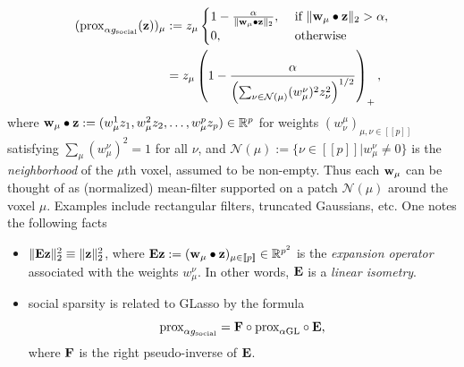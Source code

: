  \begin{equation}
   \begin{split}
     (\operatorname{prox}_{\alpha g_{\text{social}}}(\mathbf{z}))_\mu &:=
     z_\mu\begin{cases}1 - \frac{\alpha}{\|\mathbf{w}_\mu \bullet \mathbf{z}\|_2}, &\mbox{ if }\|\mathbf{w}_\mu \bullet \mathbf{z}\|_2 > \alpha
       ,\\0, &\mbox{ otherwise}\end{cases}\\
     &=
     z_\mu\left(1 - \frac{\alpha}{\left(\sum_{\nu \in \mathcal N(\mu)}(w^{\nu}_{\mu})^2z_{\nu}^2\right)^{1/2}}\right)_+, 
     \end{split}
  \label{eq:social}
\end{equation}
where $\mathbf{w}_\mu \bullet \mathbf{z} := (w^1_\mu z_1,w^2_\mu z_2,\ldots,w^p_\mu z_p) \in \mathbb R^p$ for weights
$(w^\mu_\nu)_{\mu,\nu \in [\![p]\!]}$ satisfying $\sum_\mu (w^\nu_\mu)^2 = 1$ for all $\nu$, and $\mathcal N (\mu) := \{\nu \in [\![p]\!] | w^\nu_\mu \ne 0\}$ is the \textit{neighborhood} of the $\mu$th voxel, assumed to be non-empty. Thus each $\mathbf{w}_\mu$ can be thought of as
(normalized) mean-filter supported on a patch $\mathcal N(\mu)$ around the voxel $\mu$.
Examples include rectangular filters, truncated Gaussians, etc.
One notes the following facts
\begin{itemize}
\item $\|\mathbf{E}\mathbf{z}\|^2_2 \equiv \|\mathbf{z}\|^2_2$, where $\mathbf{E}\mathbf{z} := (\mathbf{w}_\mu \bullet \mathbf{z})_{\mu \in [\![p]\!]} \in \mathbb R^{p^2}$
  is the \textit{expansion operator} associated with the weights $w^\nu_\mu$. In other words, $\mathbf{E}$ is a \textit{linear isometry}.
\item social sparsity is related to GLasso by the formula
  \begin{equation}
    \text{prox}_{\alpha g_{\text{social}}} = \mathbf{F} \circ \text{prox}_{\alpha \text{GL}} \circ \mathbf{E},
  \end{equation}
  where $\mathbf{F}$ is the right pseudo-inverse of $\mathbf{E}$.
\end{itemize}


